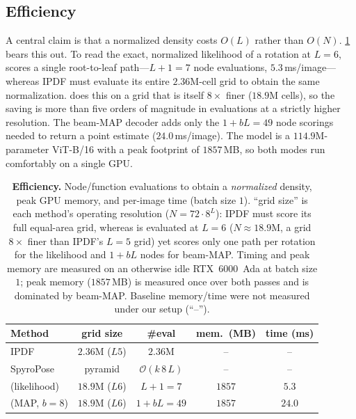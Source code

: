 \subsection{Efficiency}
\label{sec:efficiency}

A central claim is that a normalized density costs $O(L)$ rather than $O(N)$.
\cref{tab:efficiency} bears this out. To read the exact, normalized likelihood of
a rotation at $L{=}6$, \method{} scores a single root-to-leaf path---$L{+}1{=}7$
node evaluations, $5.3$\,ms/image---whereas IPDF must evaluate its entire
$2.36$M-cell grid to obtain the same normalization. \method{} does this on a grid
that is itself $8\times$ finer ($18.9$M cells), so the saving is more than five
orders of magnitude in evaluations at a strictly higher resolution. The beam-MAP
decoder adds only the $1{+}bL{=}49$ node scorings needed to return a point
estimate ($24.0$\,ms/image). The model is a $114.9$M-parameter ViT-B/16 with a
peak footprint of $1857$\,MB, so both modes run comfortably on a single GPU.

\begin{table}[t]
\centering
\caption{\textbf{Efficiency.} Node/function evaluations to obtain a \emph{normalized}
density, peak GPU memory, and per-image time (batch size $1$). ``grid size'' is each
method's operating resolution ($N{=}72\cdot8^{L}$): IPDF must score its full
equal-area grid, whereas \method{} is evaluated at $L{=}6$ ($N{\approx}18.9$M, a
grid $8\times$ finer than IPDF's $L{=}5$ grid) yet scores
only one path per rotation for the likelihood and $1{+}bL$ nodes for beam-MAP.
Timing and peak memory are measured on an otherwise idle RTX~6000~Ada at batch
size $1$; peak memory ($1857$\,MB) is measured once over both passes and is
dominated by beam-MAP. Baseline memory/time were not measured under our setup
(``--'').}
\label{tab:efficiency}
\small
\setlength{\tabcolsep}{3pt}
\begin{tabular}{l cccc}
\toprule
Method & grid size & \#eval & mem.\ (MB) & time (ms) \\
\midrule
IPDF~\cite{murphy2021ipdf} & $2.36$M ($L5$) & $2.36$M & -- & -- \\
SpyroPose~\cite{haugaard2023spyropose} & pyramid & $\mathcal{O}(k\,8\,L)$ & -- & -- \\
\method{} (likelihood) & $18.9$M ($L6$) & $L{+}1{=}7$ & $1857$ & $5.3$ \\
\method{} (MAP, $b{=}8$) & $18.9$M ($L6$) & $1{+}bL{=}49$ & $1857$ & $24.0$ \\
\bottomrule
\end{tabular}
\end{table}

